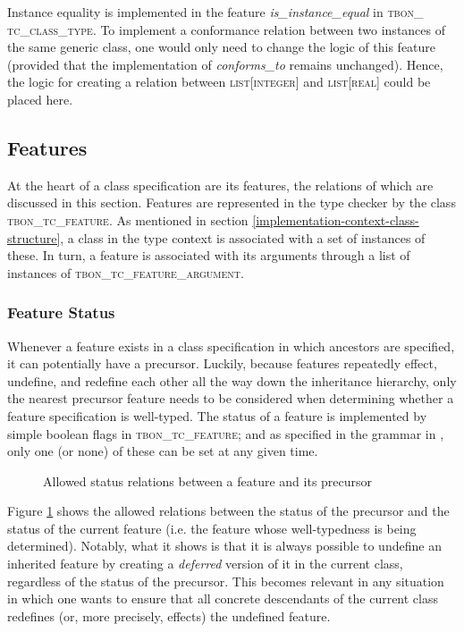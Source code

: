 Instance equality is implemented in the feature \textit{is\_instance\_equal} in \textsc{tbon\_ tc\_class\_type}. To implement a conformance relation between two instances of the same generic class, one would only need to change the logic of this feature (provided that the implementation of \textit{conforms\_to} remains unchanged). Hence, the logic  for creating a relation between \textsc{list}[\textsc{integer}] and \textsc{list}[\textsc{real}] could be placed here.

\subsection{Features}
At the heart of a class specification are its features, the relations of which are discussed in this section. Features are represented in the type checker by the class \textsc{tbon\_tc\_feature}. As mentioned in section \ref{implementation-context-class-structure}, a class in the type context is associated with a set of instances of these. In turn, a feature is associated with its arguments through a list of instances of \textsc{tbon\_tc\_feature\_argument}. 
\subsubsection{Feature Status}
Whenever a feature exists in a class specification in which ancestors are specified, it can potentially have a precursor. Luckily, because features repeatedly effect, undefine, and redefine each other all the way down the inheritance hierarchy, only the nearest precursor feature needs to be considered when determining whether a feature specification is well-typed. The status of a feature is implemented by simple boolean flags in \textsc{tbon\_tc\_feature}; and as specified in the grammar in \cite{walden1995}, only one (or none) of these can be set at any given time.
\begin{figure}[H]
    \centerline{}
    \caption[Feature status matrix]{Allowed status relations between a feature and its precursor}
    \label{fig:feature_status}
\end{figure}
Figure \ref{fig:feature_status} shows the allowed relations between the status of the precursor and the status of the current feature (i.e. the feature whose well-typedness is being determined). Notably, what it shows is that it is always possible to undefine an inherited feature by creating a \textit{deferred} version of it in the current class, regardless of the status of the precursor. This becomes relevant in any situation in which one wants to ensure that all concrete descendants of the current class redefines (or, more precisely, effects) the undefined feature.


